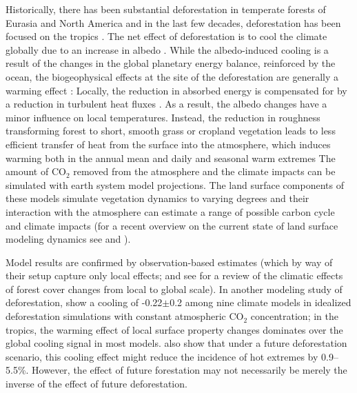 \documentclass[draft]{agujournal2019}
\begin{document}
Historically, there has been substantial deforestation in temperate forests of Eurasia and North America and in the last few decades, deforestation has been focused on the tropics \cite{goldewijk_estimating_2001}.
The net effect of deforestation is to cool the climate globally due to an increase in albedo \cite{davin_climatic_2010}.
While the albedo-induced cooling is a result of the changes in the global planetary energy balance, reinforced by the ocean, the biogeophysical effects at the site of the deforestation are generally a warming effect \cite{winckler_nonlocal_2019,kumar_land_2013,li_potential_2016,betts_biogeophysical_2001,lee_observed_2011}: Locally, the reduction in absorbed energy is compensated for by a reduction in turbulent heat fluxes \cite{winckler_importance_2019}.
As a result, the albedo changes have a minor influence on local temperatures.
Instead, the reduction in roughness transforming forest to short, smooth grass or cropland vegetation leads to less efficient transfer of heat from the surface into the atmosphere, which induces warming both in the annual mean and daily and seasonal warm extremes \cite{winckler_different_2019}
The amount of CO$_2$ removed from the atmosphere and the climate impacts can be simulated with earth system model projections.
The land surface components of these models simulate vegetation dynamics to varying degrees and their interaction with the atmosphere can estimate a range of possible carbon cycle and climate impacts (for a recent overview on the current state of land surface modeling dynamics see  and ).

Model results are confirmed by observation-based estimates (which by way of their setup capture only local effects;  and see  for a review of the climatic effects of forest cover changes from local to global scale).
In another modeling study of deforestation,  show a cooling of -0.22$\pm$0.2 \textcelsius{} among nine climate models in idealized deforestation simulations with constant atmospheric CO$_2$ concentration; in the tropics, the warming effect of local surface property changes dominates over the global cooling signal in most models.
 also show that under a future deforestation scenario, this cooling effect might reduce the incidence of hot extremes by 0.9--5.5\%.
However, the effect of future forestation may not necessarily be merely the inverse of the effect of future deforestation.
\end{document}
